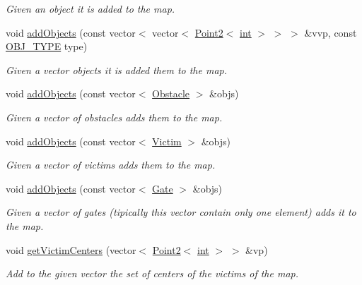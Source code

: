 \begin{DoxyCompactItemize}
\begin{DoxyCompactList}\small\item\em Given an object it is added to the map. \end{DoxyCompactList}\item 
void \mbox{\hyperlink{class_mapp_ab235ba9946b7c5e44a4914ca26f6d5fc}{add\+Objects}} (const vector$<$ vector$<$ \mbox{\hyperlink{class_point2}{Point2}}$<$ \mbox{\hyperlink{draw_8hh_aa620a13339ac3a1177c86edc549fda9b}{int}} $>$ $>$ $>$ \&vvp, const \mbox{\hyperlink{map_8hh_a714b9c2c276fbae637fee36453d9121e}{O\+B\+J\+\_\+\+T\+Y\+PE}} type)
\begin{DoxyCompactList}\small\item\em Given a vector objects it is added them to the map. \end{DoxyCompactList}\item 
void \mbox{\hyperlink{class_mapp_a346993a223bdfec975bb6365ef640c2c}{add\+Objects}} (const vector$<$ \mbox{\hyperlink{class_obstacle}{Obstacle}} $>$ \&objs)
\begin{DoxyCompactList}\small\item\em Given a vector of obstacles adds them to the map. \end{DoxyCompactList}\item 
void \mbox{\hyperlink{class_mapp_a46385479c68f30deb76adbf9a5cff9c3}{add\+Objects}} (const vector$<$ \mbox{\hyperlink{class_victim}{Victim}} $>$ \&objs)
\begin{DoxyCompactList}\small\item\em Given a vector of victims adds them to the map. \end{DoxyCompactList}\item 
void \mbox{\hyperlink{class_mapp_a99b3e0e922c4cd5416343ad7e08d8e72}{add\+Objects}} (const vector$<$ \mbox{\hyperlink{class_gate}{Gate}} $>$ \&objs)
\begin{DoxyCompactList}\small\item\em Given a vector of gates (tipically this vector contain only one element) adds it to the map. \end{DoxyCompactList}\item 
void \mbox{\hyperlink{class_mapp_a3b3ad207536bfb80c9ea2fd254bfdd80}{get\+Victim\+Centers}} (vector$<$ \mbox{\hyperlink{class_point2}{Point2}}$<$ \mbox{\hyperlink{draw_8hh_aa620a13339ac3a1177c86edc549fda9b}{int}} $>$ $>$ \&vp)
\begin{DoxyCompactList}\small\item\em Add to the given vector the set of centers of the victims of the map. \end{DoxyCompactList}\item 

\end{DoxyCompactItemize}
